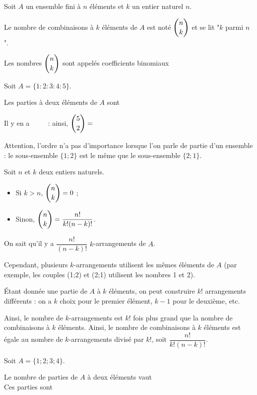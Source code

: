 \documentclass[11pt,fleqn, openany]{book} %
\begin{document}
\begin{definition} Soit $A$ un ensemble fini à $n$ éléments et $k$ un entier naturel $n$. 

Le nombre de combinaisons à $k$ éléments de $A$ est noté $\dbinom{n}{k}$ et se lit "$k$ parmi $n$". 

Les nombres $\dbinom{n}{k}$ sont appelés coefficients binomiaux\end{definition}

\begin{example}Soit $A=\{1:2:3:4:5\}$. 

Les parties à deux éléments de $A$ sont 

Il y en a $\qquad$ : ainsi, $\dbinom{5}{2}=$\end{example}

Attention, l'ordre n'a pas d'importance lorsque l'on parle de partie d'un ensemble : le sous-ensemble $\{1;2\}$ est le même que le sous-ensemble $\{2;1\}$.


\begin{proposition} Soit $n$ et $k$ deux entiers naturels.
\begin{itemize}
\item Si $k > n$, $\dbinom{n}{k}=0$ ;
\item Sinon, $\dbinom{n}{k} = \dfrac{n!}{k!(n-k)!}$.
\end{itemize}\end{proposition}

\begin{demonstration}On sait qu'il y a $\dfrac{n!}{(n-k)!}$ $k$-arrangements de $A$. 

Cependant, plusieurs $k$-arrangements utilisent les mêmes éléments de $A$ (par exemple, les couples (1;2) et (2;1) utilisent les nombres 1 et 2). 

Étant donnée une partie de $A$ à $k$ éléments, on peut construire $k!$ arrangements différents : on a $k$ choix pour le premier élément, $k-1$ pour le deuxième, etc.

Ainsi, le nombre de $k$-arrangements est $k!$ fois plus grand que la nombre de combinaisons à $k$ éléments. Ainsi, le nombre de combinaisons à $k$ éléments est égale au nombre de $k$-arrangements divisé par $k!$, soit $\dfrac{n!}{k!(n-k)!}$.\end{demonstration}

\newpage

\begin{example} Soit $A=\{1;2;3;4\}$. 

Le nombre de parties de $A$ à deux éléments vaut \\ 
\vskip5pt Ces parties sont\end{example}
\end{document}
